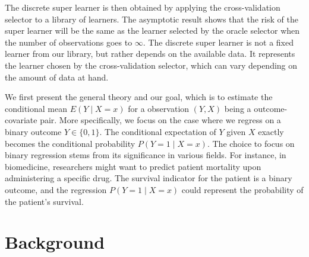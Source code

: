 \documentclass[11pt, a4paper]{article}
\theoremstyle{definition}
\theoremstyle{remark}
\begin{document}
The discrete super learner is then obtained by applying the cross-validation selector to a library of learners. The asymptotic result shows that the risk of the super learner will be the same as the learner selected by the oracle selector when the number of observations goes to $ \infty $. The discrete super learner is not a fixed learner from our library, but rather depends on the available data. It represents the learner chosen by the cross-validation selector, which can vary depending on the amount of data at hand.

We first present the general theory and our goal, which is to estimate the conditional mean $ E(Y \mid X = x) $ for a observation  $ (Y, X) $ being a outcome-covariate pair. More specifically, we focus on the case where we regress on a binary outcome $ Y \in \{0,1\} $. The conditional expectation of $ Y $ given $ X $ exactly becomes the conditional probability $ P(Y = 1 \mid X = x) $. The choice to focus on binary regression stems from its significance in various fields. For instance, in biomedicine, researchers might want to predict patient mortality upon administering a specific drug. The survival indicator for the patient is a binary outcome, and the regression $ P(Y = 1 \mid X = x) $ could represent the probability of the patient's survival. 

\section{Background}
\end{document}
